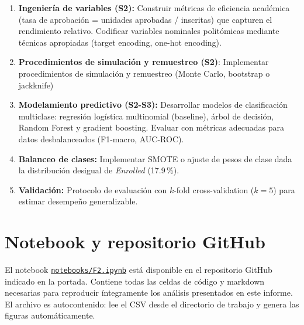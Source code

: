 \documentclass[11pt,a4paper]{article}
\newcommand{\guia}[1]{{\small\itshape\color{gris}#1}\par\vspace{0.15em}}
\begin{document}
\begin{enumerate}[noitemsep]
    \item \textbf{Ingeniería de variables (S2):} Construir métricas de eficiencia académica (tasa de aprobación = unidades aprobadas / inscritas) que capturen el rendimiento relativo. Codificar variables nominales politómicas mediante técnicas apropiadas (target encoding, one-hot encoding).
    \item \textbf{Procedimientos de simulación y remuestreo (S2)}: Implementar procedimientos de simulación y remuestreo (Monte Carlo, bootstrap o jackknife)
    \item \textbf{Modelamiento predictivo (S2-S3):} Desarrollar modelos de clasificación multiclase: regresión logística multinomial (baseline), árbol de decisión, Random Forest y gradient boosting. Evaluar con métricas adecuadas para datos desbalanceados (F1-macro, AUC-ROC).
    \item \textbf{Balanceo de clases:} Implementar SMOTE o ajuste de pesos de clase dada la distribución desigual de \textit{Enrolled} (17.9\,\%).
    \item \textbf{Validación:} Protocolo de evaluación con $k$-fold cross-validation ($k=5$) para estimar desempeño generalizable.
\end{enumerate}

\section{Notebook y repositorio GitHub}


El notebook \texttt{\href{https://github.com/dark452/mcdi501-grupo1/blob/main/notebooks/F2.ipynb}{notebooks/F2.ipynb}} está disponible en el repositorio GitHub indicado en la portada. Contiene todas las celdas de código y markdown necesarias para reproducir íntegramente los análisis presentados en este informe. El archivo es autocontenido: lee el CSV desde el directorio de trabajo y genera las figuras automáticamente.
\end{document}
